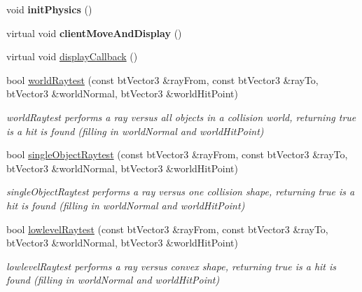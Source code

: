 \begin{DoxyCompactItemize}
\item 
\hypertarget{class_raytracer_af74007f0febd7e5e63aec4f498d1121b}{void {\bfseries init\+Physics} ()}\label{class_raytracer_af74007f0febd7e5e63aec4f498d1121b}

\item 
\hypertarget{class_raytracer_a988ce9a49234fda835a5d693c7d01116}{virtual void {\bfseries client\+Move\+And\+Display} ()}\label{class_raytracer_a988ce9a49234fda835a5d693c7d01116}

\item 
virtual void \hyperlink{class_raytracer_ab426a13ec9c917425f3181bb759a2bf2}{display\+Callback} ()
\item 
bool \hyperlink{class_raytracer_aed90423808c62b4fbfa7c19d645d1ffc}{world\+Raytest} (const bt\+Vector3 \&ray\+From, const bt\+Vector3 \&ray\+To, bt\+Vector3 \&world\+Normal, bt\+Vector3 \&world\+Hit\+Point)
\begin{DoxyCompactList}\small\item\em world\+Raytest performs a ray versus all objects in a collision world, returning true is a hit is found (filling in world\+Normal and world\+Hit\+Point) \end{DoxyCompactList}\item 
\hypertarget{class_raytracer_a1c5b9e75ac95f42fb771834091028cc4}{bool \hyperlink{class_raytracer_a1c5b9e75ac95f42fb771834091028cc4}{single\+Object\+Raytest} (const bt\+Vector3 \&ray\+From, const bt\+Vector3 \&ray\+To, bt\+Vector3 \&world\+Normal, bt\+Vector3 \&world\+Hit\+Point)}\label{class_raytracer_a1c5b9e75ac95f42fb771834091028cc4}

\begin{DoxyCompactList}\small\item\em single\+Object\+Raytest performs a ray versus one collision shape, returning true is a hit is found (filling in world\+Normal and world\+Hit\+Point) \end{DoxyCompactList}\item 
\hypertarget{class_raytracer_a68f494d0cd5b4869fad5fe3b18b8aeed}{bool \hyperlink{class_raytracer_a68f494d0cd5b4869fad5fe3b18b8aeed}{lowlevel\+Raytest} (const bt\+Vector3 \&ray\+From, const bt\+Vector3 \&ray\+To, bt\+Vector3 \&world\+Normal, bt\+Vector3 \&world\+Hit\+Point)}\label{class_raytracer_a68f494d0cd5b4869fad5fe3b18b8aeed}

\begin{DoxyCompactList}\small\item\em lowlevel\+Raytest performs a ray versus convex shape, returning true is a hit is found (filling in world\+Normal and world\+Hit\+Point) \end{DoxyCompactList}\end{DoxyCompactItemize}
